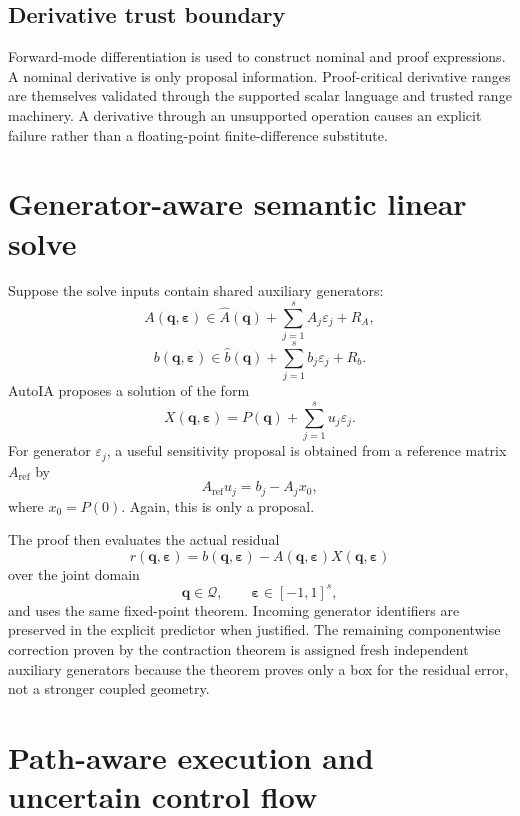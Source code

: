 \documentclass[11pt]{article}
\newcommand{\Qdom}{\mathcal{Q}}
\newcommand{\eps}{\varepsilon}
\newcommand{\epsv}{\boldsymbol{\varepsilon}}
\newcommand{\qv}{\mathbf{q}}
\begin{document}
\subsection{Derivative trust boundary}

Forward-mode differentiation is used to construct nominal and proof expressions.
A nominal derivative is only proposal information.  Proof-critical derivative
ranges are themselves validated through the supported scalar language and trusted
range machinery.  A derivative through an unsupported operation causes an
explicit failure rather than a floating-point finite-difference substitute.


\section{Generator-aware semantic linear solve}

Suppose the solve inputs contain shared auxiliary generators:
\[
  A(\qv,\epsv)
  \in
  \widehat A(\qv)+\sum_{j=1}^s A_j\eps_j+R_A,
\]
\[
  b(\qv,\epsv)
  \in
  \widehat b(\qv)+\sum_{j=1}^s b_j\eps_j+R_b.
\]
AutoIA proposes a solution of the form
\[
  \boxed{
  X(\qv,\epsv)
  =P(\qv)+\sum_{j=1}^s u_j\eps_j.
  }
\]
For generator \(\eps_j\), a useful sensitivity proposal is obtained from a
reference matrix \(A_{\mathrm{ref}}\) by
\[
  A_{\mathrm{ref}}u_j
  =b_j-A_jx_0,
\]
where \(x_0=P(0)\).  Again, this is only a proposal.

The proof then evaluates the actual residual
\[
  r(\qv,\epsv)
  =b(\qv,\epsv)-A(\qv,\epsv)X(\qv,\epsv)
\]
over the joint domain
\[
  \qv\in\Qdom,
  \qquad
  \epsv\in[-1,1]^s,
\]
and uses the same fixed-point theorem.  Incoming generator identifiers are
preserved in the explicit predictor when justified.  The remaining componentwise
correction proven by the contraction theorem is assigned fresh independent
auxiliary generators because the theorem proves only a box for the residual
error, not a stronger coupled geometry.

\section{Path-aware execution and uncertain control flow}
\end{document}
